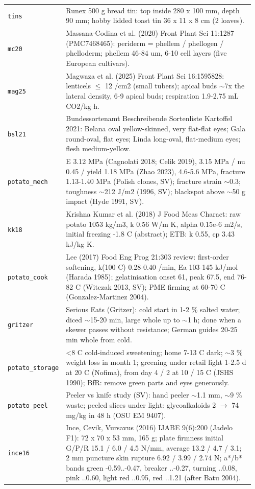 \documentclass[10.5pt,a4paper]{article}
\begin{document}
{\begin{longtable}{@{}p{0.16\linewidth}p{0.8\linewidth}@{}}
\texttt{tins} & Runex 500 g bread tin: top inside 280 x 100 mm, depth 90 mm; hobby lidded toast tin 36 x 11 x 8 cm (2 loaves). \\
\texttt{mc20} & Massana-Codina et al. (2020) Front Plant Sci 11:1287 (PMC7468465): periderm = phellem / phellogen / phelloderm; phellem 46-84 um, 6-10 cell layers (five European cultivars). \\
\texttt{mag25} & Magwaza et al. (2025) Front Plant Sci 16:1595828: lenticels $\le$ 12 /cm2 (small tubers); apical buds $\sim$7x the lateral density, 6-9 apical buds; respiration 1.9-2.75 mL CO2/kg h. \\
\texttt{bsl21} & Bundessortenamt Beschreibende Sortenliste Kartoffel 2021: Belana oval yellow-skinned, very flat-flat eyes; Gala round-oval, flat eyes; Linda long-oval, flat-medium eyes; flesh medium-yellow. \\
\texttt{potato\_\allowbreak{}mech} & E 3.12 MPa (Cagnolati 2018; Celik 2019), 3.15 MPa / nu 0.45 / yield 1.18 MPa (Zhao 2023), 4.6-5.6 MPa, fracture 1.13-1.40 MPa (Polish clones, SV); fracture strain $\sim$0.3; toughness $\sim$212 J/m2 (1996, SV); blackspot above $\sim$50 g impact (Hyde 1991, SV). \\
\texttt{kk18} & Krishna Kumar et al. (2018) J Food Meas Charact: raw potato 1053 kg/m3, k 0.56 W/m K, alpha 0.15e-6 m2/s, initial freezing -1.8 C (abstract); ETB: k 0.55, cp 3.43 kJ/kg K. \\
\texttt{potato\_\allowbreak{}cook} & Lee (2017) Food Eng Prog 21:303 review: first-order softening, k(100 C) 0.28-0.40 /min, Ea 103-145 kJ/mol (Harada 1985); gelatinisation onset 61, peak 67.5, end 76-82 C (Witczak 2013, SV); PME firming at 60-70 C (Gonzalez-Martinez 2004). \\
\texttt{gritzer} & Serious Eats (Gritzer): cold start in 1-2 \% salted water; diced $\sim$15-20 min, large whole up to $\sim$1 h; done when a skewer passes without resistance; German guides 20-25 min whole from cold. \\
\texttt{potato\_\allowbreak{}storage} & <8 C cold-induced sweetening; home 7-13 C dark; $\sim$3 \% weight loss in month 1; greening under retail light 1-2.5 d at 20 C (Nofima), from day 4 / 2 at 10 / 15 C (JSHS 1990); BfR: remove green parts and eyes generously. \\
\texttt{potato\_\allowbreak{}peel} & Peeler vs knife study (SV): hand peeler $\sim$1.1 mm, $\sim$9 \% waste; peeled slices under light: glycoalkaloids 2 $\to$ 74 mg/kg in 48 h (OSU EM 9407). \\
\texttt{ince16} & Ince, Cevik, Vursavus (2016) IJABE 9(6):200 (Jadelo F1): 72 x 70 x 53 mm, 165 g; plate firmness initial G/P/R 15.1 / 6.0 / 4.5 N/mm, average 13.2 / 4.7 / 3.1; 2 mm puncture skin rupture 6.92 / 3.99 / 2.74 N; a*/b* bands green -0.59..-0.47, breaker ..-0.27, turning ..0.08, pink ..0.60, light red ..0.95, red ..1.21 (after Batu 2004). \\

\end{longtable}}
\end{document}
